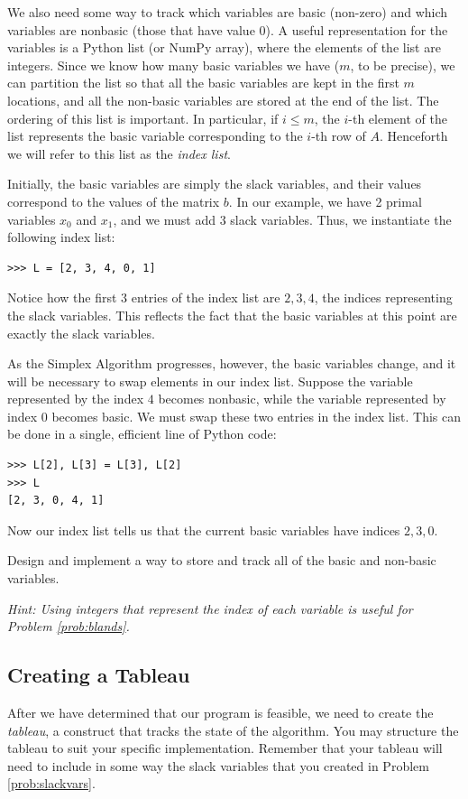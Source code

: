 We also need some way to track which variables are basic (non-zero) and which variables are nonbasic (those that have value $0$).
A useful representation for the variables is a Python list (or NumPy array), where the elements of the list are integers.
Since we know how many basic variables we have ($m$, to be precise), we can partition the list so that all the basic
variables are kept in the first $m$ locations, and all the non-basic variables are stored at the end of the list.
The ordering of this list is important. In particular, if $i \leq m$, the $i$-th element of the list represents
the basic variable corresponding to the $i$-th row of $A$. Henceforth we will refer to this list as the \emph{index list}.

Initially, the basic variables are simply the slack variables, and their values correspond to the values of the matrix $b$.
In our example, we have 2 primal variables $x_0$ and $x_1$, and we must add 3 slack variables.
Thus, we instantiate the following index list:
\begin{lstlisting}
>>> L = [2, 3, 4, 0, 1]
\end{lstlisting}
Notice how the first $3$ entries of the index list are $2, 3, 4$, the indices representing the slack variables.
This reflects the fact that the basic variables at this point are exactly the slack variables.

As the Simplex Algorithm progresses, however, the basic variables change, and it will be necessary to swap
elements in our index list. Suppose the variable represented by the index $4$ becomes nonbasic, while
the variable represented by index $0$ becomes basic. We must swap these two entries in the index list.
This can be done in a single, efficient line of Python code:
\begin{lstlisting}
>>> L[2], L[3] = L[3], L[2]
>>> L
[2, 3, 0, 4, 1]
\end{lstlisting}
Now our index list tells us that the current basic variables have indices $2, 3, 0$.

\begin{problem}
Design and implement a way to store and track all of the basic and non-basic variables.

\emph{Hint: Using integers that represent the index of each variable is useful for Problem \ref{prob:blands}.}
\label{prob:slackvars}
\end{problem}

\subsection{Creating a Tableau}
After we have determined that our program is feasible, we need to create the \emph{tableau}, a construct
that tracks the state of the algorithm.
You may structure the tableau to suit your specific implementation.
Remember that your tableau will need to include in some way the slack variables that you created in Problem
\ref{prob:slackvars}.

